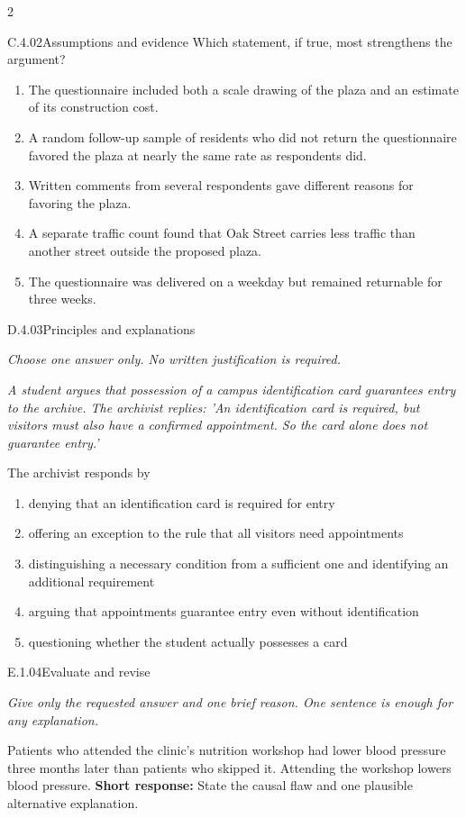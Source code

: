 \documentclass[9pt]{extarticle}
\newcommand{\choice}[1]{\item #1}
\begin{document}
\begin{multicols}{2}
\begin{DenseCoreProblem}{C.4.02}{Assumptions and evidence}
Which statement, if true, most strengthens the argument?
\begin{enumerate}[label=(\alph*)]
  \choice{The questionnaire included both a scale drawing of the plaza and an estimate of its construction cost.}
  \choice{A random follow-up sample of residents who did not return the questionnaire favored the plaza at nearly the same rate as respondents did.}
  \choice{Written comments from several respondents gave different reasons for favoring the plaza.}
  \choice{A separate traffic count found that Oak Street carries less traffic than another street outside the proposed plaza.}
  \choice{The questionnaire was delivered on a weekday but remained returnable for three weeks.}
\end{enumerate}
\end{DenseCoreProblem}
\begin{DenseCoreProblem}{D.4.03}{Principles and explanations}
{\scriptsize\textit{Choose one answer only. No written justification is required.}\par}
\emph{A student argues that possession of a campus identification card guarantees entry to the archive. The archivist replies: 'An identification card is required, but visitors must also have a confirmed appointment. So the card alone does not guarantee entry.'}

The archivist responds by
\begin{enumerate}[label=(\alph*)]
  \choice{denying that an identification card is required for entry}
  \choice{offering an exception to the rule that all visitors need appointments}
  \choice{distinguishing a necessary condition from a sufficient one and identifying an additional requirement}
  \choice{arguing that appointments guarantee entry even without identification}
  \choice{questioning whether the student actually possesses a card}
\end{enumerate}
\end{DenseCoreProblem}
\begin{DenseCoreProblem}{E.1.04}{Evaluate and revise}
{\scriptsize\textit{Give only the requested answer and one brief reason. One sentence is enough for any explanation.}\par}
Patients who attended the clinic's nutrition workshop had lower blood pressure three months later than patients who skipped it. Attending the workshop lowers blood pressure.
\textbf{Short response:} State the causal flaw and one plausible alternative explanation.
\end{DenseCoreProblem}
\end{multicols}
\end{document}
